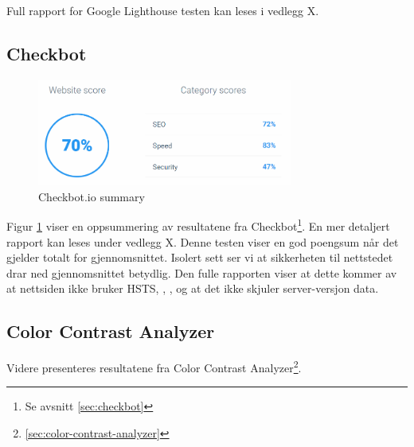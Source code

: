 Full rapport for Google Lighthouse testen kan leses i vedlegg X.

\subsection{Checkbot}
\begin{figure}[H]
    \centering
    \includegraphics[width=0.75\textwidth]{bjornar/checkbotio-summary.png}
    \caption{Checkbot.io summary}
    \label{fig:analysis-current-checkbot-summary}
\end{figure}

 Figur \ref{fig:analysis-current-checkbot-summary} viser en oppsummering av resultatene fra Checkbot\footnote{Se avsnitt \ref{sec:checkbot}}. En mer detaljert rapport kan leses under vedlegg X. Denne testen viser en god poengsum når det gjelder totalt for gjennomsnittet. Isolert sett ser vi at sikkerheten til nettstedet drar ned gjennomsnittet betydlig. Den fulle rapporten viser at dette kommer av at nettsiden ikke bruker HSTS, , ,  og at det ikke skjuler server-versjon data.

\subsection{Color Contrast Analyzer}
\label{sec:analysis-current-color-contrast-analyzer}
Videre presenteres resultatene fra Color Contrast Analyzer\footnote{\ref{sec:color-contrast-analyzer}}.

